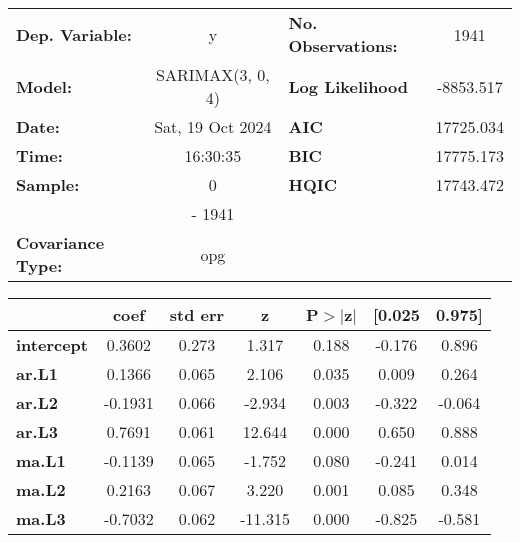 \documentclass[
  number,
  preprint,
  3p,
  onecolumn]{elsarticle}
\begin{document}
\begin{center}
\begin{tabular}{lclc}
\toprule
\textbf{Dep. Variable:}          &        y         & \textbf{  No. Observations:  } &    1941     \\
\textbf{Model:}                  & SARIMAX(3, 0, 4) & \textbf{  Log Likelihood     } & -8853.517   \\
\textbf{Date:}                   & Sat, 19 Oct 2024 & \textbf{  AIC                } & 17725.034   \\
\textbf{Time:}                   &     16:30:35     & \textbf{  BIC                } & 17775.173   \\
\textbf{Sample:}                 &        0         & \textbf{  HQIC               } & 17743.472   \\
\textbf{}                        &      - 1941      & \textbf{                     } &             \\
\textbf{Covariance Type:}        &       opg        & \textbf{                     } &             \\
\bottomrule
\end{tabular}
\begin{tabular}{lcccccc}
                   & \textbf{coef} & \textbf{std err} & \textbf{z} & \textbf{P$> |$z$|$} & \textbf{[0.025} & \textbf{0.975]}  \\
\midrule
\textbf{intercept} &       0.3602  &        0.273     &     1.317  &         0.188        &       -0.176    &        0.896     \\
\textbf{ar.L1}     &       0.1366  &        0.065     &     2.106  &         0.035        &        0.009    &        0.264     \\
\textbf{ar.L2}     &      -0.1931  &        0.066     &    -2.934  &         0.003        &       -0.322    &       -0.064     \\
\textbf{ar.L3}     &       0.7691  &        0.061     &    12.644  &         0.000        &        0.650    &        0.888     \\
\textbf{ma.L1}     &      -0.1139  &        0.065     &    -1.752  &         0.080        &       -0.241    &        0.014     \\
\textbf{ma.L2}     &       0.2163  &        0.067     &     3.220  &         0.001        &        0.085    &        0.348     \\
\textbf{ma.L3}     &      -0.7032  &        0.062     &   -11.315  &         0.000        &       -0.825    &       -0.581     \\

\end{tabular}
\end{center}
\end{document}
